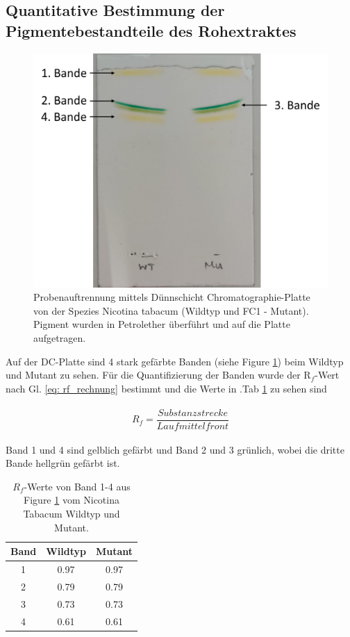 \documentclass[10pt,a4paper]{article}
\begin{document}
		\subsection{Quantitative Bestimmung der Pigmentebestandteile des Rohextraktes}
			
			\begin{figure}[H]
				\centering
				\includegraphics[scale=0.65]{DC-Plate_with_label.png}
				\caption{Probenauftrennung mittels Dünnschicht Chromatographie-Platte von der Spezies Nicotina tabacum (Wildtyp und FC1 - Mutant). Pigment wurden in Petrolether überführt und auf die Platte aufgetragen.}
				\label{fig:DC_Platte}
			\end{figure}
		
		Auf der DC-Platte sind 4 stark gefärbte Banden (siehe Figure \ref{fig:DC_Platte}) beim Wildtyp und Mutant zu sehen. Für die Quantifizierung der Banden wurde der R$_f$-Wert nach Gl. \ref{eq: rf_rechnung} bestimmt und die Werte in .Tab \ref{tab:Rf_wert} zu sehen sind\\
		\\
		\begin{equation}\label{eq: rf_rechnung}
			R_f = \frac{Substanzstrecke}{Laufmittelfront}
		\end{equation}
		\\
		Band 1 und 4 sind gelblich gefärbt und Band 2 und 3 grünlich, wobei die dritte Bande hellgrün gefärbt ist.\\
		
			\begin{table}[H]
				\centering
				\caption{$R_f$-Werte von Band 1-4 aus Figure \ref{fig:DC_Platte} vom Nicotina Tabacum Wildtyp und Mutant.}
				\label{tab:Rf_wert}
				\begin{tabular}{ccc}
					\toprule
					Band&Wildtyp& Mutant\\
					\midrule
					1& 0.97 & 0.97\\
					2 & 0.79 & 0.79\\
					3 & 0.73 & 0.73 \\
					4 & 0.61 & 0.61\\
					\bottomrule
				\end{tabular}
			\end{table}	
			
\end{document}

